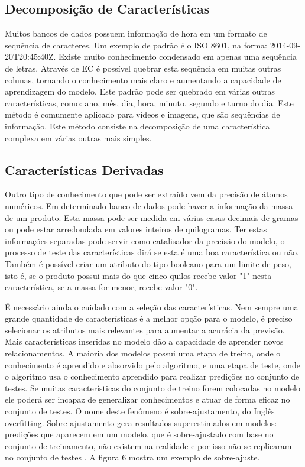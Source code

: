 \subsection{Decomposição de Características}
Muitos bancos de dados possuem informação de hora em um formato de sequência de caracteres. Um exemplo de padrão é o ISO 8601, na forma: 2014-09-20T20:45:40Z. Existe muito conhecimento condensado em apenas uma sequência de letras. Através de EC é possível quebrar esta sequência em muitas outras colunas, tornando o conhecimento mais claro e aumentando a capacidade de aprendizagem do modelo. Este padrão pode ser quebrado em várias outras características, como: ano, mês, dia, hora, minuto, segundo e turno do dia. Este método é comumente aplicado para vídeos e imagens, que são sequências de informação. Este método consiste na decomposição de uma característica complexa em várias outras mais simples.


\subsection{Características Derivadas}
Outro tipo de conhecimento que pode ser extraído vem da precisão de átomos numéricos. Em determinado banco de dados pode haver a informação da massa de um produto. Esta massa pode ser medida em várias casas decimais de gramas ou pode estar arredondada em valores inteiros de quilogramas. Ter estas informações separadas pode servir como catalisador da precisão do modelo, o processo de teste das características dirá se esta é uma boa característica ou não. Também é possível criar um atributo do tipo booleano para um limite de peso, isto é, se o produto possui mais do que cinco quilos recebe valor "1" nesta característica, se a massa for menor, recebe valor "0".

É necessário ainda o cuidado com a seleção das características. Nem sempre uma grande quantidade de características é a melhor opção para o modelo, é  preciso selecionar os atributos mais relevantes para aumentar a acurácia da previsão. Mais características inseridas no modelo dão a capacidade de aprender novos relacionamentos. A maioria dos modelos possui uma etapa de treino, onde o conhecimento é aprendido e absorvido pelo algoritmo, e uma etapa de teste, onde o algoritmo usa o conhecimento aprendido para realizar predições no conjunto de testes. Se muitas características do conjunto de treino forem colocadas no modelo ele poderá ser incapaz de generalizar conhecimentos e atuar de forma eficaz no conjunto de testes. O nome deste fenômeno é sobre-ajustamento, do Inglês overfitting. Sobre-ajustamento gera resultados superestimados em modelos: predições que aparecem em um modelo, que é sobre-ajustado com base no conjunto de treinamento, não existem na realidade e por isso não se replicaram no conjunto de testes \cite{what2013}. A figura 6  mostra um exemplo de sobre-ajuste.

